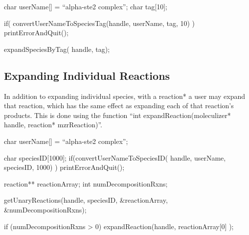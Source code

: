 \begin{ExampleC}

char userName[] = ``alpha-ste2 complex'';
char tag[10];

if( convertUserNameToSpeciesTag(handle, userName, tag, 10) ) printErrorAndQuit();

expandSpeciesByTag( handle, tag);

\end{ExampleC}

\subsection{Expanding Individual Reactions}
In addition to expanding individual species, with a reaction* a user
may expand that reaction, which has the same effect as expanding each
of that reaction's products.  This is done using the function ``int
expandReaction(moleculizer* handle, reaction* mzrReaction)''. 

\begin{ExampleC}
  char userName[] = ``alpha-ste2 complex'';

  char speciesID[1000];
  if(convertUserNameToSpeciesID( handle, userName, speciesID, 1000) ) 
  { 
    printErrorAndQuit();
  }

  reaction** reactionArray;
  int numDecompositionRxns;

  getUnaryReactions(handle, speciesID, &reactionArray, &numDecompositionRxns);

  if (numDecompositionRxns > 0)
  {
    expandReaction(handle, reactionArray[0] );
  }
  

\end{ExampleC}









